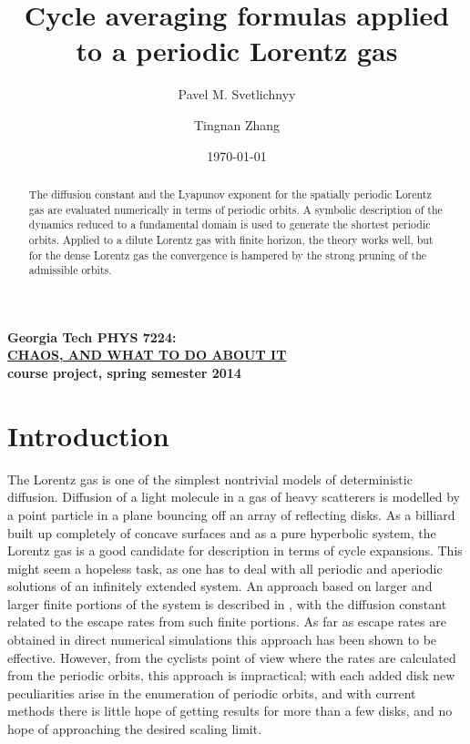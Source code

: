 \documentclass[pre,twocolumn,groupedaddress,showpacs,showkeys]{revtex4}
\begin{document}
				\title{
Cycle averaging formulas applied to a periodic Lorentz gas
				}\author{
Pavel M. Svetlichnyy}
                \author{
Tingnan Zhang}
				\date{\today} %

				\begin{abstract}
The diffusion constant and the Lyapunov exponent
for the spatially periodic Lorentz gas are evaluated
numerically in terms of periodic orbits.
A symbolic description of the dynamics reduced to a fundamental domain is
used to generate the shortest periodic orbits.
Applied to a dilute Lorentz gas with finite horizon, the
theory works well, but for the dense Lorentz gas the convergence
is hampered by the strong pruning of the admissible orbits.
                \end{abstract}
					\maketitle

\noindent
{\bf Georgia Tech PHYS 7224:}\\
\underline{\bf CHAOS, AND WHAT TO DO ABOUT IT }\\
{\bf course project, spring semester 2014}


\section{Introduction}
The Lorentz gas is one of the simplest nontrivial models
of deterministic diffusion.
Diffusion of a light molecule in a gas of heavy scatterers
is modelled
by a point particle in a plane bouncing off an array of reflecting disks.
As a billiard built up completely of
concave surfaces and as a pure hyperbolic system, the
Lorentz gas is a good candidate for description in terms of cycle
expansions.
This might seem a hopeless task, as one
has to deal with all periodic and aperiodic
solutions of an infinitely extended system. An
approach based on larger and larger finite portions of the system is described
in , with the diffusion constant related to
the escape rates from such finite portions.
As far as escape rates are obtained in direct numerical simulations
this approach has been shown to be effective.
However, from the cyclists point of view
where the rates are calculated from the periodic orbits,
this approach is impractical; with each added disk new peculiarities arise
in the enumeration of periodic orbits, and with current
methods there is little hope of getting results for more than a few disks,
and no hope of approaching the desired scaling limit.
\end{document}
